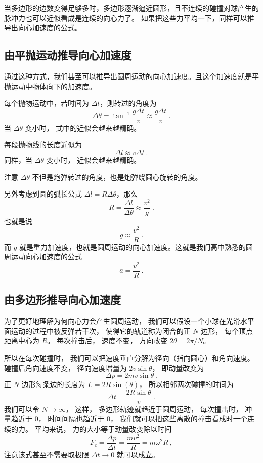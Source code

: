 当多边形的边数变得足够多时，多边形逐渐逼近圆形，且不连续的碰撞对球产生的脉冲力也可以近似看成是连续的向心力了。 如果把这些力平均一下，同样可以推导出向心加速度的公式。


\subsection{由平抛运动推导向心加速度}
通过这种方式，我们甚至可以推导出圆周运动的向心加速度。且这个加速度就是平抛运动中物体向下的加速度。

每个抛物运动中，若时间为 $\Delta t$，则转过的角度为
\begin{equation}
\Delta\theta = \tan^{-1}\frac{g\Delta t}{v} \approx \frac{g\Delta t}{v}~.
\end{equation}
当 $\Delta\theta$ 变小时， 式中的近似会越来越精确。

每段抛物线的长度近似为
\begin{equation}
\Delta l \approx v \Delta t~.
\end{equation}
同样，当 $\Delta\theta$ 变小时， 近似会越来越精确。

注意 $\Delta\theta$ 不但是炮弹转过的角度，也是炮弹绕圆心旋转的角度。

另外考虑到圆的弧长公式 $\Delta l = R\Delta\theta$，那么
\begin{equation}
R = \frac{\Delta l}{\Delta\theta} \approx \frac{v^2}{g}~.
\end{equation}
也就是说
\begin{equation}
g \approx \frac{v^2}{R}~.
\end{equation}
而 $g$ 就是重力加速度，也就是圆周运动的向心加速度。这就是我们高中熟悉的圆周运动向心加速度的公式
\begin{equation}
a = \frac{v^2}{R}~.
\end{equation}

\subsection{由多边形推导向心加速度}
为了更好地理解为何向心力会产生圆周运动， 我们可以假设一个小球在光滑水平面运动的过程中被反弹若干次， 使得它的轨道称为闭合的正 $N$ 边形， 每个顶点距离中心为 $R$。 每次撞击后， 速度不变， 方向改变 $2\theta  = 2\pi/N$。


所以在每次碰撞时， 我们可以把速度垂直分解为径向（指向圆心）和角向速度。 碰撞后角向速度不变， 径向速度增量为 $2v\sin\theta$， 即动量改变为
\begin{equation}
\Delta p = 2mv\sin\theta~.
\end{equation}
正 $N$ 边形每条边的长度为 $L = 2R\sin(\theta)$， 所以相邻两次碰撞的时间为
\begin{equation}
\Delta t = \frac{2R\sin\theta}{v}~.
\end{equation}
我们可以令 $N \to \infty$， 这样， 多边形轨迹就趋近于圆周运动， 每次撞击时， 冲量趋近于 0， 时间间隔也趋近于 0， 我们就可以把这些离散的撞击看成时一个连续的力。 平均来说， 力的大小等于动量改变除以时间
\begin{equation}
F_c = \frac{\Delta p}{\Delta t} = \frac{mv^2}{R} = m\omega^2 R~,
\end{equation}
注意该式甚至不需要取极限 $\Delta t \to 0$ 就可以成立。
